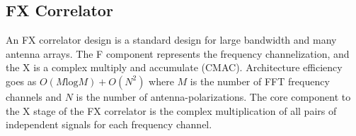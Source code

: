 \documentclass[useAMS,macros,usenatbib,onecolumn]{mn2e}
\begin{document}


\subsection{FX Correlator}
\label{correlator}

An FX correlator design is a standard design for large bandwidth and many antenna arrays.
The F component represents the frequency channelization, and the X is a complex multiply and accumulate (CMAC).
Architecture efficiency goes as $O( M \textrm{log} M) + O( N^2)$ where $M$ is the number of FFT frequency channels and $N$ is the number of antenna-polarizations.
The core component to the X stage of the FX correlator is the complex multiplication of all pairs of independent signals for each frequency channel.
\end{document}
